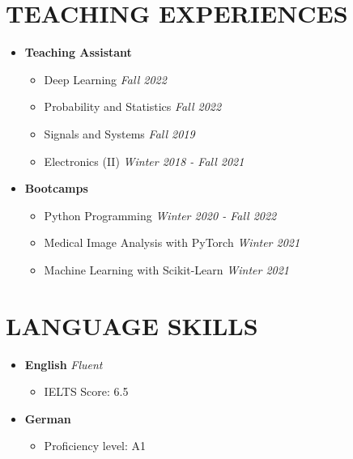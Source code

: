 \documentclass[11pt,a4paper,sans]{moderncv} %
\newcommand*{\authorimg}[1]{%
	\raisebox{-.3\baselineskip}{%
		\texttt{[image: \#1]}%
	}%
}
\begin{document}

\section{TEACHING EXPERIENCES}

\begin{itemize}
    \item \textbf{Teaching Assistant}
    \begin{itemize}
        \item \authorimg{Images/aut.png} Deep Learning \hfill \textit{Fall 2022}
        \item \authorimg{Images/aut.png} Probability and Statistics \hfill \textit{Fall 2022}
        \item \authorimg{Images/aut.png} Signals and Systems \hfill \textit{Fall 2019}
        \item \authorimg{Images/aut.png} Electronics (II) \hfill \textit{Winter 2018 - Fall 2021}
    \end{itemize}
    
    \item \textbf{Bootcamps}
    \begin{itemize}
        \item \authorimg{Images/parspajouhan_logo.jpeg} Python Programming \hfill \textit{Winter 2020 - Fall 2022}
        \item \authorimg{Images/parspajouhan_logo.jpeg} Medical Image Analysis with PyTorch \hfill \textit{Winter 2021}
        \item \authorimg{Images/parspajouhan_logo.jpeg} Machine Learning with Scikit-Learn \hfill \textit{Winter 2021}
    \end{itemize}
\end{itemize}

\section{LANGUAGE SKILLS}

\begin{itemize}
    \item \textbf{English} \hspace{6 pt} \textit{Fluent}
    \begin{itemize}
        \item IELTS Score: 6.5
    \end{itemize}
    \item \textbf{German} \hspace{6 pt}
    \begin{itemize}
        \item Proficiency level: A1
    \end{itemize}
\end{itemize}
\end{document}
